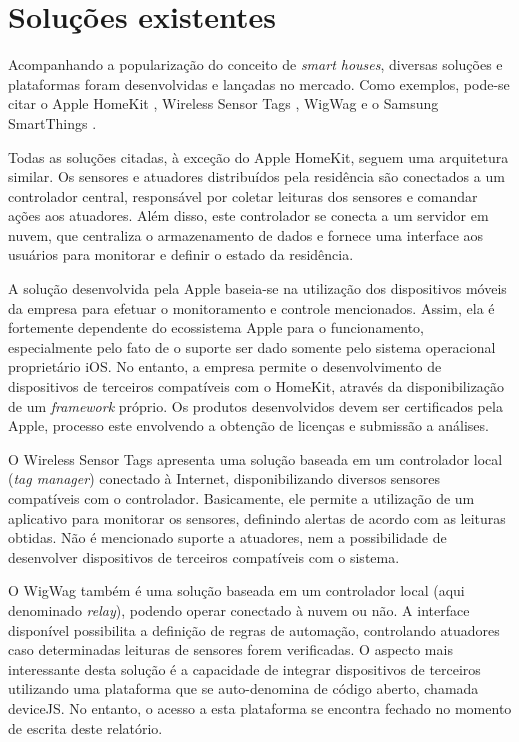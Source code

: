 \section{Soluções existentes}\label{sec:solutions}
Acompanhando a popularização do conceito de \textit{smart houses}, diversas soluções e plataformas foram desenvolvidas e lançadas no mercado. Como exemplos, pode-se citar o Apple HomeKit \cite{homekit}, Wireless Sensor Tags \cite{wsensortags}, WigWag \cite{wigwag} e o Samsung SmartThings \cite{smartthings}.

Todas as soluções citadas, à exceção do Apple HomeKit, seguem uma arquitetura similar. Os sensores e atuadores distribuídos pela residência são conectados a um controlador central, responsável por coletar leituras dos sensores e comandar ações aos atuadores. Além disso, este controlador se conecta a um servidor em nuvem, que centraliza o armazenamento de dados e fornece uma interface aos usuários para monitorar e definir o estado da residência.

A solução desenvolvida pela Apple baseia-se na utilização dos dispositivos móveis da empresa para efetuar o monitoramento e controle mencionados. Assim, ela é fortemente dependente do ecossistema Apple para o funcionamento, especialmente pelo fato de o suporte ser dado somente pelo sistema operacional proprietário iOS. No entanto, a empresa permite o desenvolvimento de dispositivos de terceiros compatíveis com o HomeKit, através da disponibilização de um \textit{framework} próprio. Os produtos desenvolvidos devem ser certificados pela Apple, processo este envolvendo a obtenção de licenças e submissão a análises.

O Wireless Sensor Tags apresenta uma solução baseada em um controlador local (\textit{tag manager}) conectado à Internet, disponibilizando diversos sensores compatíveis com o controlador. Basicamente, ele permite a utilização de um aplicativo para monitorar os sensores, definindo alertas de acordo com as leituras obtidas. Não é mencionado suporte a atuadores, nem a possibilidade de desenvolver dispositivos de terceiros compatíveis com o sistema.

O WigWag também é uma solução baseada em um controlador local (aqui denominado \textit{relay}), podendo operar conectado à nuvem ou não. A interface disponível possibilita a definição de regras de automação, controlando atuadores caso determinadas leituras de sensores forem verificadas. O aspecto mais interessante desta solução é a capacidade de integrar dispositivos de terceiros utilizando uma plataforma que se auto-denomina de código  aberto, chamada deviceJS. No entanto, o acesso a esta plataforma se encontra fechado no momento de escrita deste relatório.

